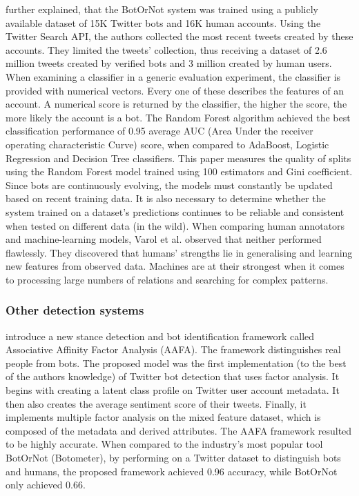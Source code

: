     \textcite[281-282, 284]{OnlineHumanBotInteractions} further explained, that the BotOrNot system was trained using a publicly available dataset of 15K Twitter bots and 16K human accounts. Using the Twitter Search API, the authors collected the most recent tweets created by these accounts. They limited the tweets' collection, thus receiving a dataset of 2.6 million tweets created by verified bots and 3 million created by human users.
    When examining a classifier in a generic evaluation experiment, the classifier is provided with numerical vectors. Every one of these describes the features of an account. A numerical score is returned by the classifier, the higher the score, the more likely the account is a bot. The Random Forest algorithm achieved the best classification performance of 0.95 average AUC (Area Under the receiver operating characteristic Curve) score, when compared to AdaBoost, Logistic Regression and Decision Tree classifiers. This paper measures the quality of splits using the Random Forest model trained using 100 estimators and Gini coefficient.
    Since bots are continuously evolving, the models must constantly be updated based on recent training data. It is also necessary to determine whether the system trained on a dataset’s predictions continues to be reliable and consistent when tested on different data (in the wild).
    When comparing human annotators and machine-learning models, Varol et al. observed that neither performed flawlessly. They discovered that humans’ strengths lie in generalising and learning new features from observed data. Machines are at their strongest when it comes to processing large numbers of relations and searching for complex patterns. 
    
    
    \subsubsection{Other detection systems}
    \textcite[356, 359, 362-363]{AAFA} introduce a new stance detection and bot identification framework called Associative Affinity Factor Analysis (AAFA). The framework distinguishes real people from bots. The proposed model was the first implementation (to the best of the authors knowledge) of Twitter bot detection that uses factor analysis. It begins with creating a latent class profile on Twitter user account metadata. It then also creates the average sentiment score of their tweets. Finally, it implements multiple factor analysis on the mixed feature dataset, which is composed of the metadata and derived attributes.
    The AAFA framework resulted to be highly accurate. When compared to the industry's most popular tool BotOrNot (Botometer), by performing on a Twitter dataset to distinguish bots and humans, the proposed framework achieved 0.96 accuracy, while BotOrNot only achieved 0.66. 
    
